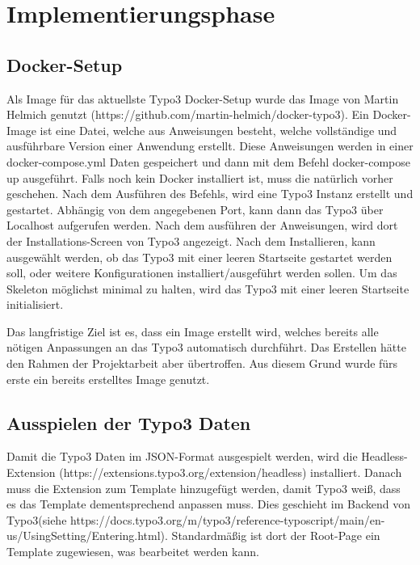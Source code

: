 \section{Implementierungsphase} 
\label{sec:Implementierungsphase}

\subsection{Docker-Setup}
\label{sec:Docker-Setup}

Als Image für das aktuellste Typo3 Docker-Setup wurde das Image von Martin Helmich genutzt (https://github.com/martin-helmich/docker-typo3). Ein Docker-Image ist eine Datei, welche aus Anweisungen besteht, welche vollständige und ausführbare Version einer Anwendung erstellt. Diese Anweisungen werden in einer docker-compose.yml Daten gespeichert und dann mit dem Befehl docker-compose up ausgeführt. Falls noch kein Docker installiert ist, muss die natürlich vorher geschehen. Nach dem Ausführen des Befehls, wird eine Typo3 Instanz erstellt und gestartet. Abhängig von dem angegebenen Port, kann dann das Typo3 über Localhost aufgerufen werden. Nach dem ausführen der Anweisungen, wird dort der Installations-Screen von Typo3 angezeigt. Nach dem Installieren, kann ausgewählt werden, ob das Typo3 mit einer leeren Startseite gestartet werden soll, oder weitere Konfigurationen installiert/ausgeführt werden sollen. Um das Skeleton möglichst minimal zu halten, wird das Typo3 mit einer leeren Startseite initialisiert.

Das langfristige Ziel ist es, dass ein Image erstellt wird, welches bereits alle nötigen Anpassungen an das Typo3 automatisch durchführt. Das Erstellen hätte den Rahmen der Projektarbeit aber übertroffen. Aus diesem Grund wurde fürs erste ein bereits erstelltes Image genutzt.

\subsection{Ausspielen der Typo3 Daten}
\label{sec:Ausspielen der Typo3 Daten}

Damit die Typo3 Daten im JSON-Format ausgespielt werden, wird die Headless-Extension \linebreak (https://extensions.typo3.org/extension/headless) installiert. Danach muss die Extension zum Template hinzugefügt werden, damit Typo3 weiß, dass es das Template dementsprechend anpassen muss. Dies geschieht im Backend von Typo3(siehe https://docs.typo3.org/m/typo3/reference-typoscript/main/en-us/UsingSetting/Entering.html). Standardmäßig ist dort der Root-Page ein Template zugewiesen, was bearbeitet werden kann.

